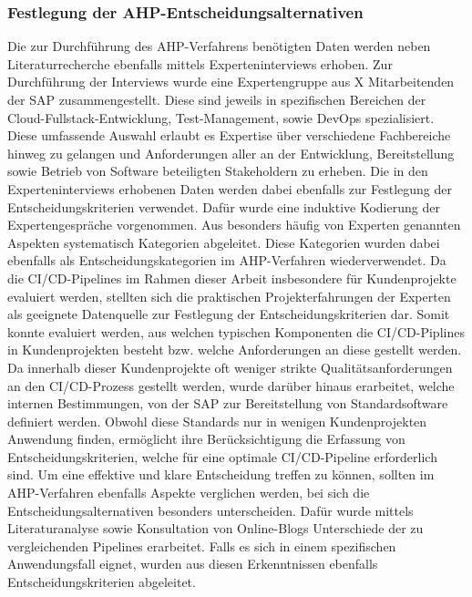 \subsubsection{Festlegung der AHP-Entscheidungsalternativen}
 Die zur Durchführung des AHP-Verfahrens benötigten Daten werden neben  Literaturrecherche ebenfalls mittels Experteninterviews erhoben. Zur Durchführung der Interviews wurde eine Expertengruppe aus X Mitarbeitenden der SAP zusammengestellt. Diese sind jeweils in spezifischen Bereichen der Cloud-Fullstack-Entwicklung, Test-Management, sowie DevOps spezialisiert. Diese umfassende Auswahl erlaubt es Expertise über verschiedene Fachbereiche hinweg zu gelangen und Anforderungen aller an der Entwicklung, Bereitstellung sowie Betrieb von Software beteiligten Stakeholdern zu erheben. Die in den Experteninterviews erhobenen Daten werden dabei ebenfalls zur Festlegung der Entscheidungskriterien verwendet. Dafür wurde eine induktive Kodierung der Expertengespräche vorgenommen. Aus besonders häufig von Experten genannten Aspekten systematisch Kategorien abgeleitet. Diese Kategorien wurden dabei ebenfalls als Entscheidungskategorien im AHP-Verfahren wiederverwendet. Da die CI/CD-Pipelines im Rahmen dieser Arbeit insbesondere für Kundenprojekte evaluiert werden, stellten sich die praktischen Projekterfahrungen der Experten als geeignete Datenquelle zur Festlegung der Entscheidungskriterien dar. Somit konnte evaluiert werden, aus welchen typischen Komponenten die CI/CD-Piplines in Kundenprojekten besteht bzw. welche Anforderungen an diese gestellt werden. Da innerhalb dieser Kundenprojekte oft weniger strikte Qualitätsanforderungen an den CI/CD-Prozess gestellt werden, wurde darüber hinaus erarbeitet, welche internen Bestimmungen, von der SAP zur Bereitstellung von Standardsoftware definiert werden. Obwohl diese Standards nur in wenigen Kundenprojekten Anwendung finden, ermöglicht ihre Berücksichtigung die Erfassung von Entscheidungskriterien, welche für eine optimale CI/CD-Pipeline erforderlich sind. Um eine effektive und klare Entscheidung treffen zu können, sollten im AHP-Verfahren ebenfalls Aspekte verglichen werden, bei sich die Entscheidungsalternativen besonders unterscheiden. Dafür wurde mittels Literaturanalyse sowie Konsultation von Online-Blogs Unterschiede der zu vergleichenden Pipelines erarbeitet. Falls es sich in einem spezifischen Anwendungsfall eignet, wurden aus diesen Erkenntnissen ebenfalls Entscheidungskriterien abgeleitet.\\
